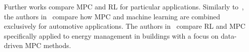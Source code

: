 Further works compare MPC and RL for particular applications.
Similarly to~\cite{mesbah_fusion_2022}, the authors in~\cite{norouzi_integrating_2023} compare how \ac{MPC} and machine learning are combined exclusively for automotive applications.
The authors in~\cite{zhang_building_2022} compare \ac{RL} and \ac{MPC} specifically applied to energy management in buildings with a focus on data-driven \ac{MPC} methods.

